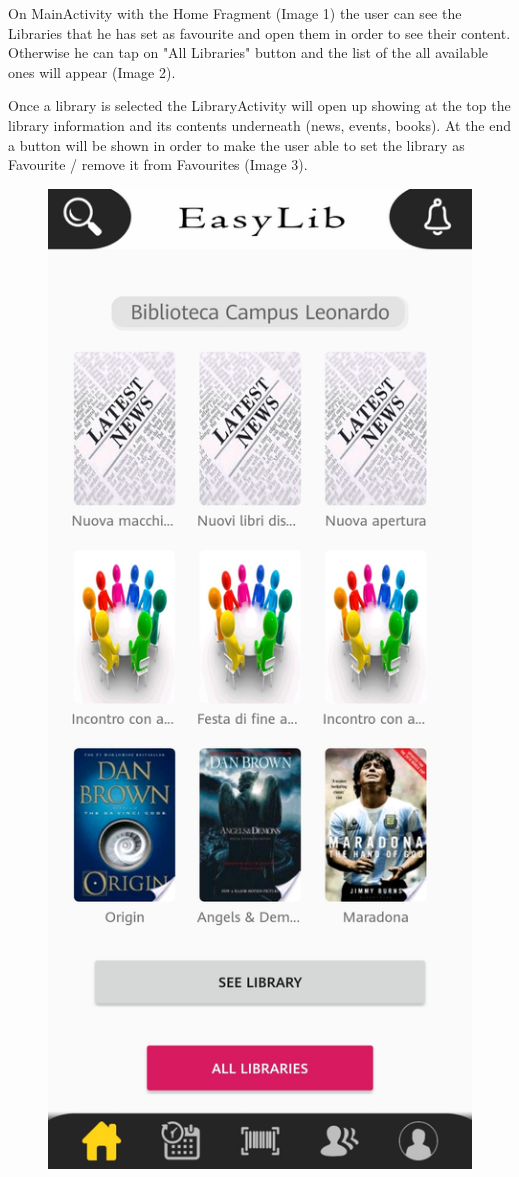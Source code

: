 \vspace{3mm}
On MainActivity with the Home Fragment (Image 1) the user can see the Libraries that he has set as favourite and open them in order to see their content. Otherwise he can tap on "All Libraries" button and the list of the all available ones will appear (Image 2).\par
Once a library is selected the LibraryActivity will open up showing at the top the library information and its contents underneath (news, events, books). At the end a button will be shown in order to make the user able to set the library as Favourite / remove it from Favourites (Image 3).
\begin{figure}[H]
	\centering
	\includegraphics[scale=0.15]{Images/UI/Libraries/1}

\end{figure}
